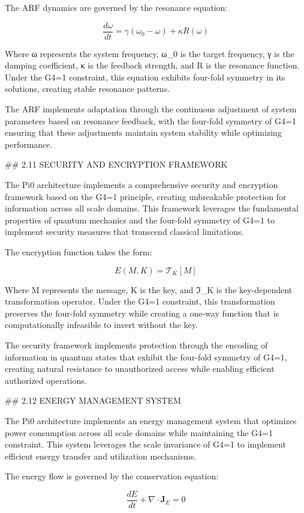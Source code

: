 The ARF dynamics are governed by the resonance equation:

$$\frac{d\omega}{dt} = \gamma(\omega_0 - \omega) + \kappa R(\omega)$$

Where ω represents the system frequency, ω_0 is the target frequency, γ is the damping coefficient, κ is the feedback strength, and R is the resonance function. Under the G4=1 constraint, this equation exhibits four-fold symmetry in its solutions, creating stable resonance patterns.

The ARF implements adaptation through the continuous adjustment of system parameters based on resonance feedback, with the four-fold symmetry of G4=1 ensuring that these adjustments maintain system stability while optimizing performance.

## 2.11 SECURITY AND ENCRYPTION FRAMEWORK

The Pi0 architecture implements a comprehensive security and encryption framework based on the G4=1 principle, creating unbreakable protection for information across all scale domains. This framework leverages the fundamental properties of quantum mechanics and the four-fold symmetry of G4=1 to implement security measures that transcend classical limitations.

The encryption function takes the form:

$$E(M, K) = \mathcal{T}_K[M]$$

Where M represents the message, K is the key, and ℑ_K is the key-dependent transformation operator. Under the G4=1 constraint, this transformation preserves the four-fold symmetry while creating a one-way function that is computationally infeasible to invert without the key.

The security framework implements protection through the encoding of information in quantum states that exhibit the four-fold symmetry of G4=1, creating natural resistance to unauthorized access while enabling efficient authorized operations.

## 2.12 ENERGY MANAGEMENT SYSTEM

The Pi0 architecture implements an energy management system that optimizes power consumption across all scale domains while maintaining the G4=1 constraint. This system leverages the scale invariance of G4=1 to implement efficient energy transfer and utilization mechanisms.

The energy flow is governed by the conservation equation:

$$\frac{dE}{dt} + \nabla \cdot \mathbf{J}_E = 0$$

